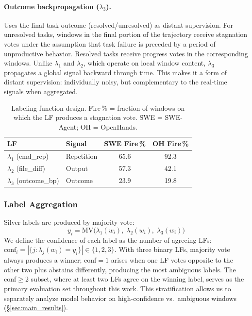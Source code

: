 \paragraph{Outcome backpropagation ($\lambda_3$).}
Uses the final task outcome (resolved/unresolved) as distant supervision.
For unresolved tasks, windows in the final portion of the trajectory receive stagnation votes under the assumption that task failure is preceded by a period of unproductive behavior.
Resolved tasks receive progress votes in the corresponding windows.
Unlike $\lambda_1$ and $\lambda_2$, which operate on local window content, $\lambda_3$ propagates a global signal backward through time.
This makes it a form of distant supervision: individually noisy, but complementary to the real-time signals when aggregated.

\begin{table}[t]
\centering
\small
\begin{tabular}{llcc}
\toprule
\textbf{LF} & \textbf{Signal} & \textbf{SWE Fire\,\%} & \textbf{OH Fire\,\%} \\
\midrule
$\lambda_1$ (cmd\_rep)    & Repetition & 65.6 & 92.3 \\
$\lambda_2$ (file\_diff)  & Output     & 57.3 & 42.1 \\
$\lambda_3$ (outcome\_bp) & Outcome    & 23.9 & 19.8 \\
\bottomrule
\end{tabular}
\caption{Labeling function design. Fire\,\% = fraction of windows on which the LF produces a stagnation vote. SWE = SWE-Agent; OH = OpenHands.}
\label{tab:lf_design}
\end{table}

\subsubsection{Label Aggregation}
\label{sec:label_aggregation}

Silver labels are produced by majority vote:
\begin{equation}
y_i = \text{MV}\bigl(\lambda_1(w_i),\; \lambda_2(w_i),\; \lambda_3(w_i)\bigr)
\label{eq:mv}
\end{equation}
We define the confidence of each label as the number of agreeing LFs: $\text{conf}_i = |\{j : \lambda_j(w_i) = y_i\}| \in \{1, 2, 3\}$.
With three binary LFs, majority vote always produces a winner; conf${=}1$ arises when one LF votes opposite to the other two plus abstains differently, producing the most ambiguous labels.
The conf${\geq}$2 subset, where at least two LFs agree on the winning label, serves as the primary evaluation set throughout this work.
This stratification allows us to separately analyze model behavior on high-confidence vs.\ ambiguous windows (\S\ref{sec:main_results}).

